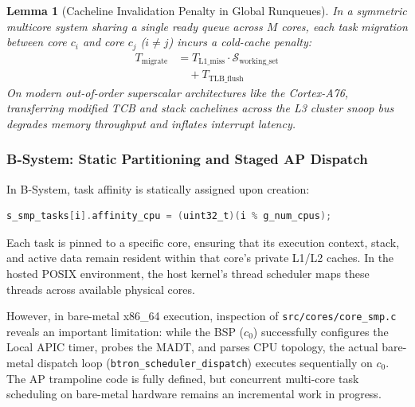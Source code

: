 \documentclass[10pt,journal,compsoc,twocolumn]{article}
\newtheorem{lemma}{Lemma}
\begin{document}
\begin{lemma}[Cacheline Invalidation Penalty in Global Runqueues]
In a symmetric multicore system sharing a single ready queue across $M$ cores, each task migration between core $c_i$ and core $c_j$ ($i \ne j$) incurs a cold-cache penalty:
\begin{equation}
\begin{aligned}
T_{\text{migrate}} &= T_{\text{L1\_miss}} \cdot \mathcal{S}_{\text{working\_set}} \\
&\quad + T_{\text{TLB\_flush}}
\end{aligned}
\end{equation}
On modern out-of-order superscalar architectures like the Cortex-A76, transferring modified TCB and stack cachelines across the L3 cluster snoop bus degrades memory throughput and inflates interrupt latency.
\end{lemma}

\subsubsection{B-System: Static Partitioning and Staged AP Dispatch}
In B-System, task affinity is statically assigned upon creation:
\begin{lstlisting}[language=C]
s_smp_tasks[i].affinity_cpu = (uint32_t)(i % g_num_cpus);
\end{lstlisting}
Each task is pinned to a specific core, ensuring that its execution context, stack, and active data remain resident within that core's private L1/L2 caches. In the hosted POSIX environment, the host kernel's thread scheduler maps these threads across available physical cores. 

However, in bare-metal x86\_64 execution, inspection of \texttt{src/cores/core\_smp.c} reveals an important limitation: while the BSP ($c_0$) successfully configures the Local APIC timer, probes the MADT, and parses CPU topology, the actual bare-metal dispatch loop (\texttt{btron\_scheduler\_dispatch}) executes sequentially on $c_0$. The AP trampoline code is fully defined, but concurrent multi-core task scheduling on bare-metal hardware remains an incremental work in progress.
\end{document}
